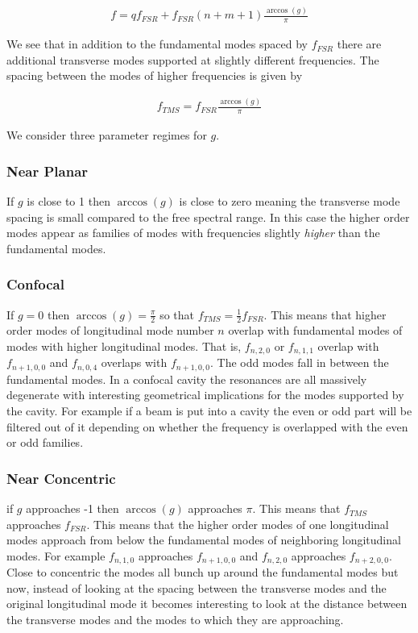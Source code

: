 \documentclass[12pt]{article}
\begin{document}
\begin{align}
f = q f_{FSR} + f_{FSR}(n+m+1)\frac{\arccos(g)}{\pi}
\end{align}

We see that in addition to the fundamental modes spaced by $f_{FSR}$ there are additional transverse modes supported at slightly different frequencies.
The spacing between the modes of higher frequencies is given by

\begin{align}
f_{TMS} = f_{FSR} \frac{\arccos(g)}{\pi}
\end{align}

We consider three parameter regimes for $g$.
\subsubsection*{Near Planar}
If $g$ is close to 1 then $\arccos(g)$ is close to zero meaning the transverse mode spacing is small compared to the free spectral range.
In this case the higher order modes appear as families of modes with frequencies slightly \textit{higher} than the fundamental modes.

\subsubsection*{Confocal}
If $g=0$ then $\arccos(g)=\frac{\pi}{2}$ so that $f_{TMS} = \frac{1}{2}f_{FSR}$.
This means that higher order modes of longitudinal mode number $n$ overlap with fundamental modes of modes with higher longitudinal modes.
That is, $f_{n,2,0}$ or $f_{n,1,1}$ overlap with $f_{n+1,0,0}$ and $f_{n,0,4}$ overlaps with $f_{n+1,0,0}$.
The odd modes fall in between the fundamental modes.
In a confocal cavity the resonances are all massively degenerate with interesting geometrical implications for the modes supported by the cavity.
For example if a beam is put into a cavity the even or odd part will be filtered out of it depending on whether the frequency is overlapped with the even or odd families.

\subsubsection*{Near Concentric}
if $g$ approaches -1 then $\arccos(g)$ approaches $\pi$.
This means that $f_{TMS}$ approaches $f_{FSR}$.
This means that the higher order modes of one longitudinal modes approach from below the fundamental modes of neighboring longitudinal modes.
For example $f_{n,1,0}$ approaches $f_{n+1,0,0}$ and $f_{n,2,0}$ approaches $f_{n+2,0,0}$.
Close to concentric the modes all bunch up around the fundamental modes but now, instead of looking at the spacing between the transverse modes and the original longitudinal mode it becomes interesting to look at the distance between the transverse modes and the modes to which they are approaching.
\end{document}
